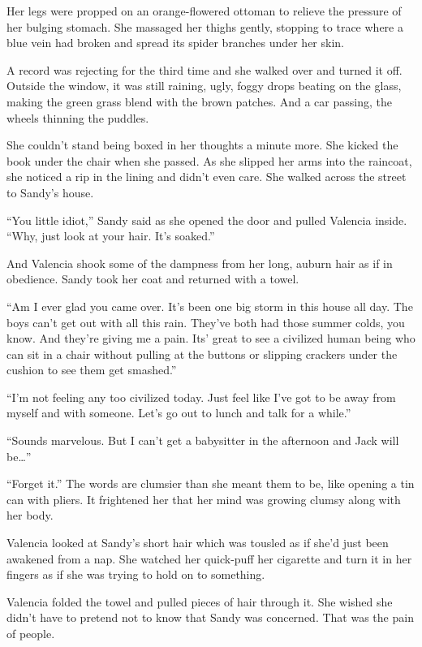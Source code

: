 \documentclass[
]{article}
\begin{document}
Her legs were propped on an orange-flowered ottoman to relieve the
pressure of her bulging stomach. She massaged her thighs gently,
stopping to trace where a blue vein had broken and spread its spider
branches under her skin.

A record was rejecting for the third time and she walked over and turned
it off. Outside the window, it was still raining, ugly, foggy drops
beating on the glass, making the green grass blend with the brown
patches. And a car passing, the wheels thinning the puddles.

She couldn't stand being boxed in her thoughts a minute more. She kicked
the book under the chair when she passed. As she slipped her arms into
the raincoat, she noticed a rip in the lining and didn't even care. She
walked across the street to Sandy's house.

``You little idiot,'' Sandy said as she opened the door and pulled
Valencia inside. ``Why, just look at your hair. It's soaked.''

And Valencia shook some of the dampness from her long, auburn hair as if
in obedience. Sandy took her coat and returned with a towel.

``Am I ever glad you came over. It's been one big storm in this house
all day. The boys can't get out with all this rain. They've both had
those summer colds, you know. And they're giving me a pain. Its' great
to see a civilized human being who can sit in a chair without pulling at
the buttons or slipping crackers under the cushion to see them get
smashed.''

``I'm not feeling any too civilized today. Just feel like I've got to be
away from myself and with someone. Let's go out to lunch and talk for a
while.''

``Sounds marvelous. But I can't get a babysitter in the afternoon and
Jack will be\ldots''

``Forget it.'' The words are clumsier than she meant them to be, like
opening a tin can with pliers. It frightened her that her mind was
growing clumsy along with her body.

Valencia looked at Sandy's short hair which was tousled as if she'd just
been awakened from a nap. She watched her quick-puff her cigarette and
turn it in her fingers as if she was trying to hold on to something.

Valencia folded the towel and pulled pieces of hair through it. She
wished she didn't have to pretend not to know that Sandy was concerned.
That was the pain of people.
\end{document}
